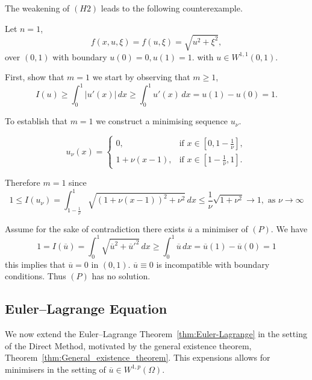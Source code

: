 \begin{example}
    The weakening of $(H2)$ leads to the following counterexample. 

Let $n=1$, 
\[
f(x,u,\xi) =f(u,\xi) =\sqrt{u^2+\xi^2},
\] 
over $(0,1)$ with boundary $u(0) =0, u(1) =1$. with $u\in W^{1,1}(0,1)$.

First, show that $m=1$ we start by observing that $m\ge 1$, 
$$
I(u) \ge \int^1_0 |u'(x)|\, dx \ge \int^1_0 u'(x)\, dx = u(1) -u(0) =1.
$$

To establish that $m=1$ we construct a minimising sequence $u_\nu$. 

$$
u_\nu(x)=
\begin{cases}
0, & \text{if } x \in \left[0,1-\frac{1}{\nu}\right],\\[0.5em]
1+\nu(x-1), & \text{if } x \in \left[1-\frac{1}{\nu},1\right].
\end{cases}
$$

Therefore $m =1$ since
$$
1 \le I(u_\nu) = \int^1_{1-\frac{1}{\nu}} \sqrt{(1+\nu(x-1))^2 +\nu^2} \, dx \le \frac{1}{\nu}\sqrt{1+\nu^2} \rightarrow 1, \text{ as }\nu \rightarrow \infty
$$

Assume for the sake of contradiction there exists $\overline{u}$ a minimiser of $(P)$. We have
$$
1 = I(\overline{u}) = \int^1_0 \sqrt{\overline{u}^2 + \overline{u}'^2} \, dx \ge \int^1_0 \overline{u}\, dx = \overline{u}(1) - \overline{u}(0) =1 
$$
this implies that $\overline{u} =0$ in $(0,1)$. $\overline{u} \equiv 0$ is incompatible with boundary conditions. Thus $(P)$ has no solution.
\end{example}

\subsection{Euler--Lagrange Equation}

We now extend the Euler--Lagrange Theorem~\ref{thm:Euler-Lagrange} in the setting of the Direct Method, motivated by the general existence theorem, Theorem~\ref{thm:General_existence_theorem}. This expensions allows for minimisers in the setting of $\overline{u} \in W^{1,p}(\Omega)$.

